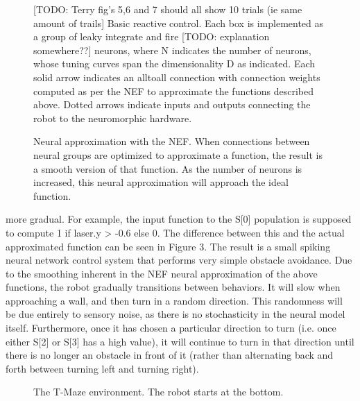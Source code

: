 \documentclass[conference]{IEEEtran}
\begin{document}
\begin{figure}[!t]
\label{React}
\centering
\caption{[TODO: Terry fig's 5,6 and 7 should all show 10 trials (ie same amount of trails] Basic reactive control. Each box is implemented as a group of leaky integrate and fire [TODO: explanation somewhere??] neurons, where N indicates the number of neurons, whose tuning curves span the dimensionality D as indicated. Each solid arrow indicates an alltoall connection with connection weights computed as per the NEF to approximate the functions described above. Dotted arrows indicate inputs
and outputs connecting the robot to the neuromorphic hardware.}
\end{figure}

\begin{figure}[!t]
\label{NEF}
\centering
\caption{Neural approximation with the NEF. When connections between neural groups are optimized to approximate a function, the result is a smooth version of that function. As the number of neurons is increased, this neural approximation will approach the ideal function.}
\end{figure}

more gradual. For example, the input function to the S[0]
population is supposed to compute 1 if laser.y > -0.6
else 0. The difference between this and the actual
approximated function can be seen in Figure 3.
The result is a small spiking neural network control
system that performs very simple obstacle avoidance. Due
to the smoothing inherent in the NEF neural approximation
of the above functions, the robot gradually transitions
between behaviors. It will slow when approaching a wall,
and then turn in a random direction. This randomness will
be due entirely to sensory noise, as there is no stochasticity
in the neural model itself. Furthermore, once it has chosen
a particular direction to turn (i.e. once either S[2] or S[3] has a high value), it will continue to turn in that direction
until there is no longer an obstacle in front of it (rather than alternating back and forth between turning left and turning right).

\begin{figure}[!t]
\label{Tmaze}
\centering
\caption{The T-Maze environment. The robot starts at the bottom.}
\end{figure}
\end{document}
